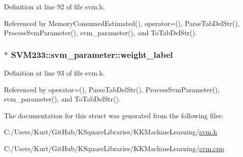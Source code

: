Definition at line 92 of file svm.\+h.



Referenced by Memory\+Consumed\+Estimated(), operator=(), Parse\+Tab\+Del\+Str(), Process\+Svm\+Parameter(), svm\+\_\+parameter(), and To\+Tab\+Del\+Str().

\subsubsection[{\texorpdfstring{weight\+\_\+label}{weight_label}}]{$\ast$ S\+V\+M233\+::svm\+\_\+parameter\+::weight\+\_\+label}\hypertarget{struct_s_v_m233_1_1svm__parameter_a7a82221dd44668d44efdf0a47f76b751}{}\label{struct_s_v_m233_1_1svm__parameter_a7a82221dd44668d44efdf0a47f76b751}


Definition at line 93 of file svm.\+h.



Referenced by operator=(), Parse\+Tab\+Del\+Str(), Process\+Svm\+Parameter(), svm\+\_\+parameter(), and To\+Tab\+Del\+Str().



The documentation for this struct was generated from the following files\+:\begin{DoxyCompactItemize}
\item 
C\+:/\+Users/\+Kurt/\+Git\+Hub/\+K\+Square\+Libraries/\+K\+K\+Machine\+Learning/\hyperlink{svm_8h}{svm.\+h}\item 
C\+:/\+Users/\+Kurt/\+Git\+Hub/\+K\+Square\+Libraries/\+K\+K\+Machine\+Learning/\hyperlink{svm_8cpp}{svm.\+cpp}\end{DoxyCompactItemize}
